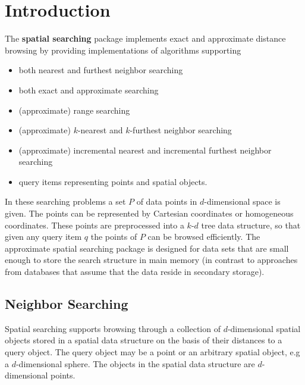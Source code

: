 

\section{Introduction}

The {\bf spatial searching} package implements
exact and approximate distance browsing
by providing implementations of algorithms supporting

\begin{itemize} 

\item
both nearest and furthest neighbor searching

\item
both exact and approximate searching

\item
(approximate) range searching

\item 
(approximate) $k$-nearest and $k$-furthest neighbor searching

\item 
(approximate) incremental nearest and incremental furthest neighbor searching

\item
query items representing points and spatial objects.

\end{itemize}

In these searching problems a set $P$ of data points in $d$-dimensional
space is given.
The points can be represented by Cartesian coordinates or homogeneous coordinates.
These points are preprocessed into a $k$-$d$ tree data structure, so that given
any query item $q$ the points of $P$ can be browsed efficiently.
The approximate spatial searching package is designed for data sets that are small enough to store
the search structure in main memory (in contrast to approaches
from databases that assume that the data reside in secondary storage).

\subsection{Neighbor Searching}

Spatial searching supports browsing through a collection of $d$-dimensional spatial objects
stored in a spatial data structure on the basis of their distances to a
query object. The query object may be a point or an arbitrary spatial object, e.g a 
$d$-dimensional sphere. The objects in the spatial data structure are $d$-dimensional points.

